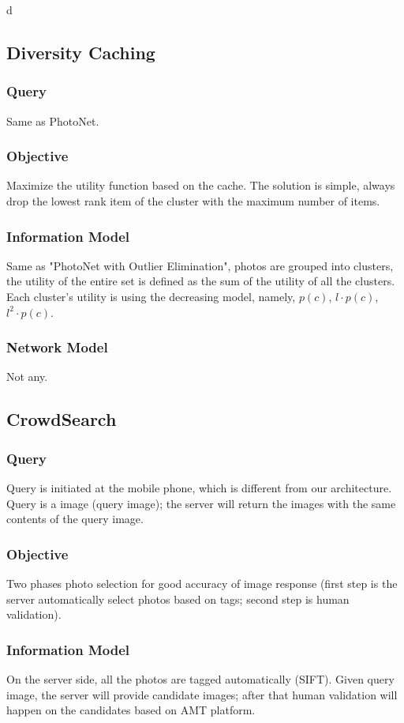 d\documentclass[letterpaper]{sig-alternate-10pt}
\begin{document}
\subsection{Diversity Caching}
\subsubsection{Query}
Same as PhotoNet.
\subsubsection{Objective}
Maximize the utility function based on the cache. The solution is simple, always drop the lowest rank item of the cluster with the maximum number of items.
\subsubsection{Information Model}
Same as "PhotoNet with Outlier Elimination", photos are grouped into clusters, the utility of the entire set is defined as the sum of the utility of all the clusters. Each cluster's utility is using the decreasing model, namely, $p(c)$, $l\cdot p(c)$, $l^2\cdot p(c)$.
\subsubsection{Network Model}
Not any.

\subsection{CrowdSearch}
\subsubsection{Query}
Query is initiated at the mobile phone, which is different from our architecture. Query is a image (query image); the server will return the images with the same contents of the query image.
\subsubsection{Objective}
Two phases photo selection for good accuracy of image response (first step is the server automatically select photos based on tags; second step is human validation).
\subsubsection{Information Model}
On the server side, all the photos are tagged automatically (SIFT). Given query image, the server will provide candidate images; after that human validation will happen on the candidates based on AMT platform.
\end{document}
